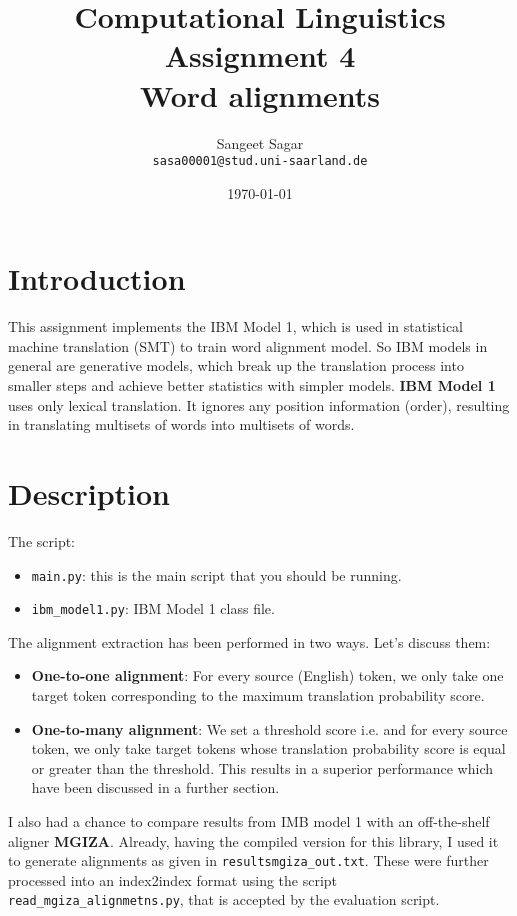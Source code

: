 \documentclass{article}[a4paper]
\title{\textbf{Computational Linguistics} \\
Assignment 4\\
Word alignments 
}
\author{Sangeet Sagar\\
            \texttt{sasa00001@stud.uni-saarland.de}
}
\date{\today}
\begin{document}
\maketitle
\section{Introduction}
This assignment implements the IBM Model 1, which is used in statistical machine translation (SMT) to train word alignment model. So IBM models in general are generative models, which break up the translation process into smaller steps and achieve better statistics with simpler models.
\textbf{IBM Model 1} uses only lexical translation. It ignores any position information (order), resulting in translating multisets of words into multisets of words.

\section{Description}
The script:
\begin{itemize}
    \item \texttt{main.py}: this is the main script that you should be running.
    \item \texttt{ibm\_model1.py}: IBM Model 1 class file.
\end{itemize}

The alignment extraction has been performed in two ways. Let's discuss them:
\begin{itemize}
    \item \textbf{One-to-one alignment}: For every source (English) token, we only take one target token corresponding to the maximum translation probability score.
    \item \textbf{One-to-many alignment}: We set a threshold score i.e.  and for every source token, we only take target tokens whose translation probability score is equal or greater than the threshold. This results in a superior performance which have been discussed in a further section.
\end{itemize}
I also had a chance to compare results from IMB model 1 with an off-the-shelf aligner \textbf{MGIZA}. Already, having the compiled version for this library, I used it to generate alignments as given in \texttt{results\/mgiza\_out.txt}. These were further processed into an index2index format using the script \texttt{read\_mgiza\_alignmetns.py}, that is accepted by the evaluation script.
\end{document}

